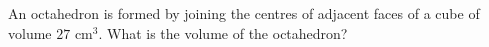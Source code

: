An octahedron is formed by joining the centres of adjacent faces of a cube of volume $27\text{ cm}^3$. What is the volume of the octahedron?
